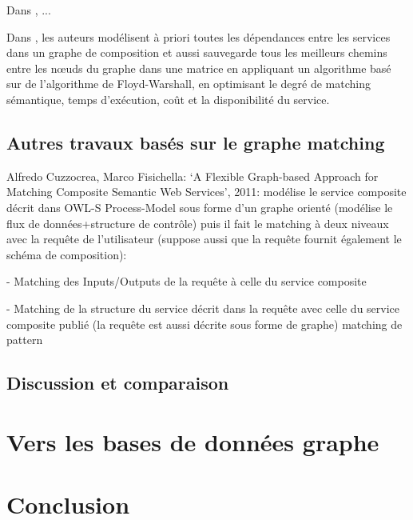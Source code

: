   \begin{text}
    Dans \cite{talantikite2009semantic}, ...
  \end{text}

  \begin{text}
    Dans \cite{elmaghraoui2011graph}, les auteurs modélisent à priori
    toutes les dépendances entre les services dans un graphe de
    composition et aussi sauvegarde tous les meilleurs chemins entre
    les nœuds du graphe dans une matrice en appliquant un algorithme
    basé sur de l'algorithme de Floyd-Warshall, en optimisant le degré
    de matching sémantique, temps d'exécution, coût et la
    disponibilité du service.
  \end{text}

  \subsection{Autres travaux basés sur le graphe matching}
  \label{sec:autres-travaux}
  Alfredo Cuzzocrea, Marco Fisichella: ‘A Flexible Graph-based
  Approach for Matching Composite Semantic Web Services’, 2011:
  modélise le service composite décrit dans OWL-S Process-Model sous
  forme d’un graphe orienté (modélise le flux de données+structure de
  contrôle) puis il fait le matching à deux niveaux avec la requête de
  l’utilisateur (suppose aussi que la requête fournit également le
  schéma de composition):

  - Matching des Inputs/Outputs de la requête
  à celle du service composite

  - Matching de la structure du service décrit dans la requête avec
  celle du service composite publié (la requête est aussi décrite sous
  forme de graphe) matching de pattern
  \newpage
  \subsection{Discussion et comparaison}
  \label{sec:discussion-comparaison}

  
\newpage
\section{Vers les bases de données graphe}
\label{sec:vers-les-bases}

\section{Conclusion}
\label{sec:conclusion-2}

